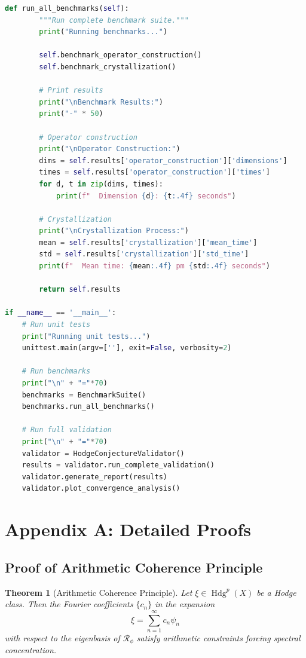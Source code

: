 \documentclass[11pt,a4paper]{article}
\theoremstyle{plain}
\newtheorem{theorem}{Theorem}[section]
\theoremstyle{definition}
\theoremstyle{remark}
\DeclareMathOperator{\Hdg}{Hdg}
\newcommand{\fracres}{\mathcal{R}}
\newcommand{\goldenratio}{\phi}
\begin{document}
\begin{lstlisting}[language=Python, caption=Complete Test Suite]
    def run_all_benchmarks(self):
        """Run complete benchmark suite."""
        print("Running benchmarks...")
        
        self.benchmark_operator_construction()
        self.benchmark_crystallization()
        
        # Print results
        print("\nBenchmark Results:")
        print("-" * 50)
        
        # Operator construction
        print("\nOperator Construction:")
        dims = self.results['operator_construction']['dimensions']
        times = self.results['operator_construction']['times']
        for d, t in zip(dims, times):
            print(f"  Dimension {d}: {t:.4f} seconds")
            
        # Crystallization
        print("\nCrystallization Process:")
        mean = self.results['crystallization']['mean_time']
        std = self.results['crystallization']['std_time']
        print(f"  Mean time: {mean:.4f} pm {std:.4f} seconds")
        
        return self.results

if __name__ == '__main__':
    # Run unit tests
    print("Running unit tests...")
    unittest.main(argv=[''], exit=False, verbosity=2)
    
    # Run benchmarks
    print("\n" + "="*70)
    benchmarks = BenchmarkSuite()
    benchmarks.run_all_benchmarks()
    
    # Run full validation
    print("\n" + "="*70)
    validator = HodgeConjectureValidator()
    results = validator.run_complete_validation()
    validator.generate_report(results)
    validator.plot_convergence_analysis()
\end{lstlisting}

\section{Appendix A: Detailed Proofs}

\subsection{Proof of Arithmetic Coherence Principle}

\begin{theorem}[Arithmetic Coherence Principle]
Let $\xi \in \Hdg^p(X)$ be a Hodge class. Then the Fourier coefficients $\{c_n\}$ in the expansion
\begin{equation}
\xi = \sum_{n=1}^{\infty} c_n \psi_n
\end{equation}
with respect to the eigenbasis of $\fracres_{\goldenratio}$ satisfy arithmetic constraints forcing spectral concentration.
\end{theorem}
\end{document}
